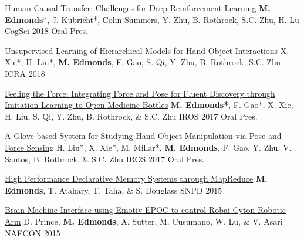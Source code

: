


\begin{cvpublications}

\item \cvpublication
{\href{http://www.mjedmonds.com/papers/IROS17_OpenBottle_final.pdf}{Human Causal Transfer: Challenges for Deep Reinforcement Learning}} %
{\textbf{M. Edmonds}*, J. Kubricht*, Colin Summers, Y. Zhu, B. Rothrock, S.C. Zhu, H. Lu} %
{CogSci 2018} %
{Oral Pres.} %

\item \cvpublication
{\href{http://www.mjedmonds.com/papers/ICRA18_Unsupervised_learning_hierarchical_hoi.pdf}{Unsupervised Learning of Hierarchical Models for Hand-Object Interactions}} %
{X. Xie*, H. Liu*, \textbf{M. Edmonds}, F. Gao, S. Qi, Y. Zhu, B. Rothrock, S.C. Zhu} %
{ICRA 2018} %
{} %

\item \cvpublication
{\href{http://www.mjedmonds.com/papers/IROS17_OpenBottle_final.pdf}{Feeling the Force: Integrating Force and Pose for Fluent Discovery through Imitation Learning to Open Medicine Bottles}} %
{\textbf{M. Edmonds*}, F. Gao*, X. Xie, H. Liu, S. Qi, Y. Zhu, B. Rothrock, \& S.C. Zhu} %
{IROS 2017} %
{Oral Pres.} %

\item \cvpublication
{\href{http://www.mjedmonds.com/papers/IROS17_GloveHardware_final.pdf}{A Glove-based System for Studying Hand-Object Manipulation via Pose and Force Sensing}} %
{H. Liu*, X. Xie*, M. Millar*, \textbf{M. Edmonds}, F. Gao, Y. Zhu, V. Santos, B. Rothrock, \& S.C. Zhu} %
{IROS 2017} %
{Oral Pres.} %

\item \cvpublication
{\href{http://www.mjedmonds.com/papers/SNPD_2015_HighPerformanceDM_final.pdf}{High Performance Declarative Memory Systems through MapReduce}} %
{\textbf{M. Edmonds}, T. Atahary, T. Taha, \& S. Douglass} %
{SNPD 2015} %
{} %


\item \cvpublication
{\href{http://www.mjedmonds.com/papers/bmi-using-emotiv.pdf}{Brain Machine Interface using Emotiv EPOC to control Robai Cyton Robotic Arm}} %
{D. Prince, \textbf{M. Edmonds}, A. Sutter, M. Cusumano, W. Lu, \& V. Asari} %
{NAECON 2015} %
{} %

\cvequalcontribution

\end{cvpublications}